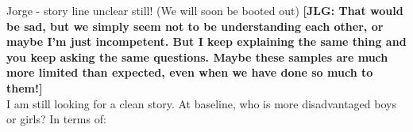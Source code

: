 


\newcommand*\leftright[2]{%
  \leavevmode
  \rlap{#1}%
  \hspace{0.5\linewidth}%
  #2}

\newcommand{\orth}{\ensuremath{\perp\!\!\!\perp}}%
\newcommand{\indep}{\orth}%
\newcommand{\notorth}{\ensuremath{\perp\!\!\!\!\!\!\diagup\!\!\!\!\!\!\perp}}%
\newcommand{\notindep}{\notorth}





\noindent Jorge - story line unclear still! (We will soon be booted out) \textbf{[JLG: That would be sad, but we simply seem not to be understanding each other, or maybe I'm just incompetent. But I keep explaining the same thing and you keep asking the same questions. Maybe these samples are much more limited than expected, even when we have done so much to them!]}\\

\noindent I am still looking for a clean story. At baseline, who is more disadvantaged boys or girls? In terms of:\\


